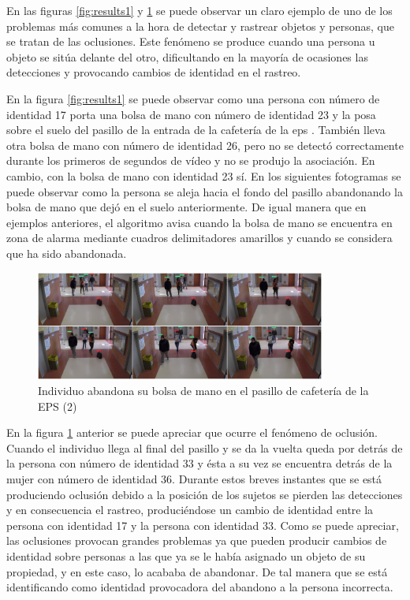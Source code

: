 En las figuras \ref{fig:results1} y \ref{fig:results2} se puede observar un claro ejemplo de uno de los problemas más comunes a la hora de detectar y rastrear objetos y personas, que se tratan de las oclusiones. Este fenómeno se produce cuando una persona u objeto se sitúa delante del otro, dificultando en la mayoría de ocasiones las detecciones y provocando cambios de identidad en el rastreo.

En la figura \ref{fig:results1} se puede observar como una persona con número de identidad 17 porta una bolsa de mano con número de identidad 23 y la posa sobre el suelo del pasillo de la entrada de la cafetería de la \gls{eps} \cite{gba-dataset}. También lleva otra bolsa de mano con número de identidad 26, pero no se detectó correctamente durante los primeros de segundos de vídeo y no se produjo la asociación. En cambio, con la bolsa de mano con identidad 23 sí. En los siguientes fotogramas se puede observar como la persona se aleja hacia el fondo del pasillo abandonando la bolsa de mano que dejó en el suelo anteriormente. De igual manera que en ejemplos anteriores, el algoritmo avisa cuando la bolsa de mano se encuentra en zona de alarma mediante cuadros delimitadores amarillos y cuando se considera que ha sido abandonada.

\begin{figure}[ht]
\centering
\includegraphics[width=0.85\textwidth]{img/chapters/resultados/abandono/2.png}
\caption{\label{fig:results2}Individuo abandona su bolsa de mano en el pasillo de cafetería de la EPS (2) \cite{gba-dataset}}
\end{figure}

En la figura \ref{fig:results2} anterior se puede apreciar que ocurre el fenómeno de oclusión. Cuando el individuo llega al final del pasillo y se da la vuelta queda por detrás de la persona con número de identidad 33 y ésta a su vez se encuentra detrás de la mujer con número de identidad 36. Durante estos breves instantes que se está produciendo oclusión debido a la posición de los sujetos se pierden las detecciones y en consecuencia el rastreo, produciéndose un cambio de identidad entre la persona con identidad 17 y la persona con identidad 33. Como se puede apreciar, las oclusiones provocan grandes problemas ya que pueden producir cambios de identidad sobre personas a las que ya se le había asignado un objeto de su propiedad, y en este caso, lo acababa de abandonar. De tal manera que se está identificando como identidad provocadora del abandono a la persona incorrecta.

